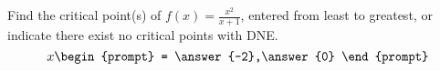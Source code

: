 \documentclass{ximera}
\author{Gregory Hartman \and Matthew Carr}
\begin{document}
\begin{exercise}






Find the critical point(s) of $f(x)=\frac{x^2}{x+1}$, entered from least to greatest, or indicate there exist no critical points with DNE.
\[
x
\begin{prompt}
= \answer{-2},\answer{0}
\end{prompt}
\]

\end{exercise}
\end{document}
